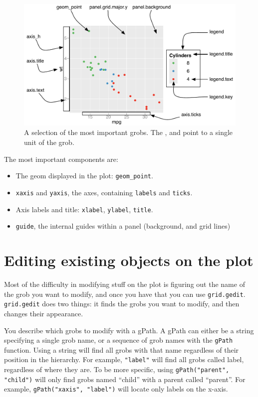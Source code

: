 \begin{figure}[htbp]
  \centering
    \includegraphics[width=\textwidth]{grid-grobs}
  \caption{A selection of the most important grobs.  The ,  and  point to a single unit of the grob.}
  \label{fig:grobs}
\end{figure}

The most important components are:

\begin{itemize}
  \item The geom displayed in the plot: {\tt geom\_point}.

  \item {\tt xaxis} and {\tt yaxis}, the axes, containing {\tt labels} and {\tt ticks}.

	\item Axis labels and title: {\tt xlabel}, {\tt ylabel}, {\tt title}.

  \item {\tt guide}, the internal guides within a panel (background, and grid lines)

\end{itemize}

\section{Editing existing objects on the plot}

Most of the difficulty in modifying stuff on the plot is figuring out the name of the grob you want to modify, and once you have that you can use {\tt grid.gedit}.  {\tt grid.gedit} does two things: it finds the grobs you want to modify, and then changes their appearance.  

You describe which grobs to modify with a gPath.  A gPath can either be a string specifying a single grob name, or a sequence of grob names with the {\tt gPath} function.  Using a string will find all grobs with that name regardless of their position in the hierarchy.  For example, {\tt "label"} will find all grobs called label, regardless of where they are.  To be more specific, using {\tt gPath("parent", "child")} will only find grobs named ``child'' with a parent called ``parent''.  For example, {\tt gPath("xaxis", "label")} will locate only labels on the x-axis.

